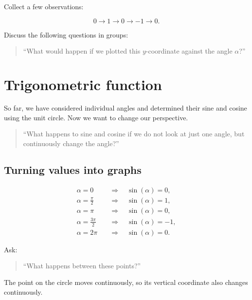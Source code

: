 \documentclass[a4paper,11pt]{article}
\begin{document}
Collect a few observations:

\begin{equation}
    0
    \rightarrow
    1
    \rightarrow
    0
    \rightarrow
    -1
    \rightarrow
    0.
\end{equation}

Discuss the following questions in groups: 

\begin{quote}
    ``What would happen if we plotted this $y$-coordinate against the
    angle $\alpha$?''
\end{quote}





\section{Trigonometric function}

So far, we have considered individual angles and determined their sine
and cosine using the unit circle.
Now we want to change our perspective.

\begin{quote}
    ``What happens to sine and cosine if we do not look at just one angle,
    but continuously change the angle?''
\end{quote}

\subsection{Turning values into graphs}

\begin{align*}
    \alpha=0
        &\quad\Rightarrow\quad \sin(\alpha)=0,\\
    \alpha=\frac{\pi}{2}
        &\quad\Rightarrow\quad \sin(\alpha)=1,\\
    \alpha=\pi
        &\quad\Rightarrow\quad \sin(\alpha)=0,\\
    \alpha=\frac{3\pi}{2}
        &\quad\Rightarrow\quad \sin(\alpha)=-1,\\
    \alpha=2\pi
        &\quad\Rightarrow\quad \sin(\alpha)=0.
\end{align*}

Ask:

\begin{quote}
    ``What happens between these points?''
\end{quote}


The point on the circle moves continuously, so its vertical coordinate
also changes continuously.
\end{document}
